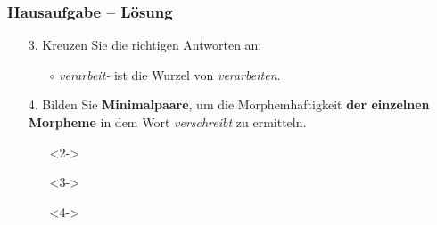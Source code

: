 \begin{frame}
\frametitle{Hausaufgabe -- Lösung}

\begin{enumerate}
	\item[3.] Kreuzen Sie die richtigen Antworten an:

	\begin{itemize}
		\item[\alertred{$\checkmark$}] 
		
		\item[$\circ$] \emph{verarbeit-} ist die Wurzel von \emph{verarbeiten}.
		
		\item[\alertred{$\checkmark$}] 
		
		\item[\alertred{$\checkmark$}] 
	\end{itemize}	
	

	\item[4.] Bilden Sie \textbf{Minimalpaare}, um die Morphemhaftigkeit \textbf{der einzelnen Morpheme} in dem Wort \emph{verschreibt} zu ermitteln.


\settowidth{}
	\begin{itemize}
		\item[\alertred{--}]<2->  
		
		\item[\alertred{--}]<3->  
		
		\item[\alertred{--}]<4->  
	\end{itemize}

\end{enumerate}

\end{frame}


